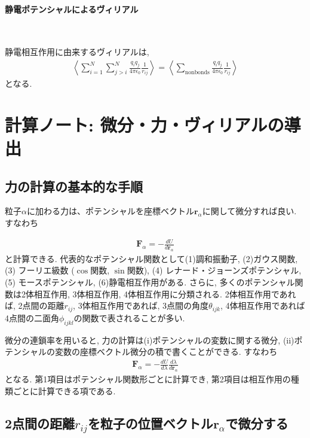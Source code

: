 \paragraph{静電ポテンシャルによるヴィリアル} \

静電相互作用に由来するヴィリアルは,
\begin{align}
  \left\langle
  \sum_{i=1}^{N} \sum_{j > i}^{N}
  \frac{q_{i}q_{j}}{4 \pi \epsilon_{0}}
  \frac{1}{r_{ij}}
  \right\rangle
 =
  \left\langle
  \sum_{\mathrm{nonbonds}}
  \frac{q_{i}q_{j}}{4 \pi \epsilon_{0}}
  \frac{1}{r_{ij}}
  \right\rangle
\end{align}
となる.

\clearpage
\section{計算ノート: 微分・力・ヴィリアルの導出}
\subsection{力の計算の基本的な手順}
粒子$\alpha$に加わる力は、ポテンシャルを座標ベクトル$\bm{r}_{\alpha}$に関して微分すれば良い. すなわち

\begin{align}
   \bm{F}_{\alpha}
   =
   -
   \frac{d U}{d \bm{r}_{\alpha}}
\end{align}
と計算できる.
代表的なポテンシャル関数として(1)調和振動子, (2)ガウス関数, (3) フーリエ級数 ($\cos$関数, $\sin$関数), (4) レナード・ジョーンズポテンシャル, (5) モースポテンシャル, (6)静電相互作用がある.
さらに, 多くのポテンシャル関数は2体相互作用, 3体相互作用, 4体相互作用に分類される.
2体相互作用であれば, 2点間の距離$r_{ij}$, 3体相互作用であれば, 3点間の角度$\theta_{ijk}$, 4体相互作用であれば4点間の二面角$\phi_{ijkl}$の関数で表されることが多い.

微分の連鎖率を用いると, 力の計算は(i)ポテンシャルの変数に関する微分, (ii)ポテンシャルの変数の座標ベクトル微分の積で書くことができる. すなわち
\begin{align}
   \bm{F}_{\alpha}
   =
   -
   \frac{d U}{d \lambda}
   \frac{d \lambda}{d \bm{r}_{\alpha}}
\end{align}
となる. 第1項目はポテンシャル関数形ごとに計算でき, 第2項目は相互作用の種類ごとに計算できる項である.


\subsection{2点間の距離$r_{ij}$を粒子の位置ベクトル$\bm{r}_{\alpha}$で微分する}
